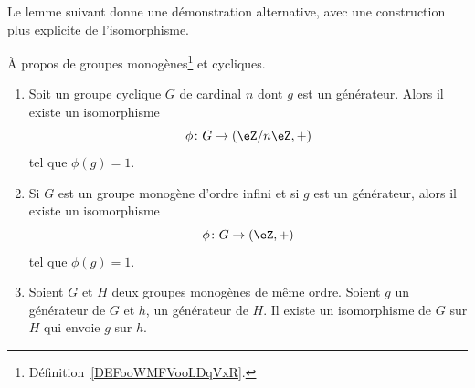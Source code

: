 Le lemme suivant donne une démonstration alternative, avec une construction plus explicite de l'isomorphisme.

\begin{lemma}   \label{LemZhxMit}

	À propos de groupes monogènes\footnote{Définition~\ref{DEFooWMFVooLDqVxR}.} et cycliques.

	\begin{enumerate}
		\item

		      Soit un groupe cyclique \( G\) de cardinal \( n\) dont \( g\) est un générateur. Alors il existe un isomorphisme
		      \begin{equation}
			      \phi\colon G\to (\eZ/n\eZ,+)
		      \end{equation}
		      tel que \( \phi(g)=1\).

		\item

		      Si \( G\) est un groupe monogène d'ordre infini et si \( g\) est un générateur, alors il existe un isomorphisme
		      \begin{equation}
			      \phi\colon G\to (\eZ,+)
		      \end{equation}
		      tel que \( \phi(g)=1\).

		\item

		      Soient \( G\) et \( H\) deux groupes monogènes de même ordre. Soient \( g\) un générateur de \( G\) et \( h\), un générateur de \( H\). Il existe un isomorphisme de \( G\) sur \( H\) qui envoie \( g\) sur \( h\).
	\end{enumerate}
\end{lemma}

